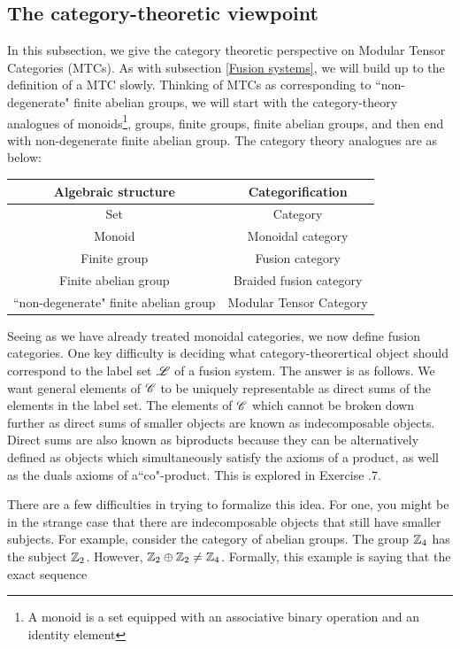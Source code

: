 \documentclass{article}
\theoremstyle{definition}
\numberwithin{figure}{section}
\begin{document}
\begin{enumerate}[\thesection .1.]
\subsection{The category-theoretic viewpoint}
\label{Category viewpoint}

In this subsection, we give the category theoretic perspective on Modular Tensor Categories (MTCs). As with subsection \ref{Fusion systems}, we will build up to the definition of a MTC slowly. Thinking of MTCs as corresponding to ``non-degenerate" finite abelian groups, we will start with the category-theory analogues of monoids\footnote{A monoid is a set equipped with an associative binary operation and an identity element}, groups, finite groups, finite abelian groups, and then end with non-degenerate finite abelian group. The category theory analogues are as below:

\begin{center}
\begin{tabular}{c ||c } 
  
Algebraic structure & Categorification \\
\hline
\hline
Set & Category \\ 
 \hline
Monoid & Monoidal category\\
 \hline
Finite group &  Fusion category\\
 \hline
Finite abelian group & Braided fusion category \\
\hline
``non-degenerate" finite abelian group & Modular Tensor Category  
\end{tabular}
\end{center}

Seeing as we have already treated monoidal categories, we now define fusion categories. One key difficulty is deciding what category-theorertical object should correspond to the label set $\mathscr{L}$ of a fusion system. The answer is as follows. We want general elements of $\mathscr{C}$ to be uniquely representable as direct sums of the elements in the label set. The elements of $\mathscr{C}$ which cannot be broken down further as direct sums of smaller objects are known as indecomposable objects. Direct sums are also known as biproducts because they can be alternatively defined as objects which simultaneously satisfy the axioms of a product, as well as the duals axioms of a``co"-product. This is explored in Exercise \thesection.7.

There are a few difficulties in trying to formalize this idea. For one, you might be in the strange case that there are indecomposable objects that still have smaller subjects. For example, consider the category of abelian groups. The group $\mathbb{Z}_4$ has the subject $\mathbb{Z}_2$. However, $\mathbb{Z}_2\oplus\mathbb{Z}_2\neq \mathbb{Z}_4$. Formally, this example is saying that the exact sequence


\end{enumerate}
\end{document}
